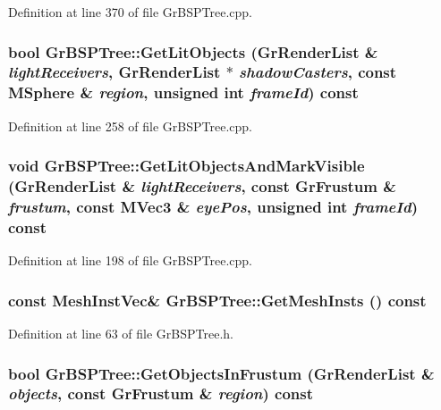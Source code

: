 Definition at line 370 of file GrBSPTree.cpp.\hypertarget{class_gr_b_s_p_tree_4d4effc32f177216a7d577c0a1aac3f9}{
\subsubsection[{GetLitObjects}]{\setlength{\rightskip}{0pt plus 5cm}bool GrBSPTree::GetLitObjects ({\bf GrRenderList} \& {\em lightReceivers}, \/  {\bf GrRenderList} $\ast$ {\em shadowCasters}, \/  const {\bf MSphere} \& {\em region}, \/  unsigned int {\em frameId}) const}}
\label{class_gr_b_s_p_tree_4d4effc32f177216a7d577c0a1aac3f9}




Definition at line 258 of file GrBSPTree.cpp.\hypertarget{class_gr_b_s_p_tree_465abf25bacaf871d1f1f854c23b2d9b}{
\subsubsection[{GetLitObjectsAndMarkVisible}]{\setlength{\rightskip}{0pt plus 5cm}void GrBSPTree::GetLitObjectsAndMarkVisible ({\bf GrRenderList} \& {\em lightReceivers}, \/  const {\bf GrFrustum} \& {\em frustum}, \/  const {\bf MVec3} \& {\em eyePos}, \/  unsigned int {\em frameId}) const}}
\label{class_gr_b_s_p_tree_465abf25bacaf871d1f1f854c23b2d9b}




Definition at line 198 of file GrBSPTree.cpp.\hypertarget{class_gr_b_s_p_tree_018210325b71cd73cb2ae8891d037f9a}{
\subsubsection[{GetMeshInsts}]{\setlength{\rightskip}{0pt plus 5cm}const {\bf MeshInstVec}\& GrBSPTree::GetMeshInsts () const}}
\label{class_gr_b_s_p_tree_018210325b71cd73cb2ae8891d037f9a}




Definition at line 63 of file GrBSPTree.h.\hypertarget{class_gr_b_s_p_tree_4c964aff2bd50e39fad7d2df046a682e}{
\subsubsection[{GetObjectsInFrustum}]{\setlength{\rightskip}{0pt plus 5cm}bool GrBSPTree::GetObjectsInFrustum ({\bf GrRenderList} \& {\em objects}, \/  const {\bf GrFrustum} \& {\em region}) const}}
\label{class_gr_b_s_p_tree_4c964aff2bd50e39fad7d2df046a682e}




